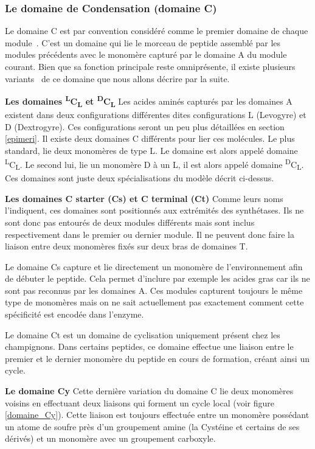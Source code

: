 \subsubsection{Le domaine de Condensation (domaine C)}

Le domaine C est par convention considéré comme le premier domaine de chaque module~\cite{stachelhaus_peptide_1998}.
C'est un domaine qui lie le morceau de peptide assemblé par les modules précédents avec le monomère capturé par le domaine A du module courant.
Bien que sa fonction principale reste omniprésente, il existe plusieurs variants~\cite{rausch_phylogenetic_2007} de ce domaine que nous allons décrire par la suite.

\textbf{Les domaines \textsuperscript{L}C\textsubscript{L} et \textsuperscript{D}C\textsubscript{L}}
Les acides aminés capturés par les domaines A existent dans deux configurations différentes dites configurations L (Levogyre) et D (Dextrogyre).
Ces configurations seront un peu plus détaillées en section \ref{epimeri}.
Il existe deux domaines C différents pour lier ces molécules.
Le plus standard, lie deux monomères de type L. Le domaine est alors appelé domaine \textsuperscript{L}C\textsubscript{L}.
Le second lui, lie un monomère D à un L, il est alors appelé domaine \textsuperscript{D}C\textsubscript{L}.
Ces domaines sont juste deux spécialisations du modèle décrit ci-dessus.

\textbf{Les domaines C starter (Cs) et C terminal (Ct)}
Comme leurs noms l'indiquent, ces domaines sont positionnés aux extrémités des synthétases.
Ils ne sont donc pas entourés de deux modules différents mais sont inclus respectivement dans le premier ou dernier module.
Il ne peuvent donc faire la liaison entre deux monomères fixés sur deux bras de domaines T.

Le domaine Cs capture et lie directement un monomère de l'environnement afin de débuter le peptide.
Cela permet d'inclure par exemple les acides gras car ils ne sont pas reconnus par les domaines A.
Ces modules capturent toujours le même type de monomères mais on ne sait actuellement pas exactement comment cette spécificité est encodée dans l'enzyme.

Le domaine Ct est un domaine de cyclisation uniquement présent chez les champignons.
Dans certains peptides, ce domaine effectue une liaison entre le premier et le dernier monomère du peptide en cours de formation, créant ainsi un cycle\cite{gao_cyclization_2012}.

\textbf{Le domaine Cy}
\label{Cy}
Cette dernière variation du domaine C lie deux monomères voisins en effectuant deux liaisons qui forment un cycle local (voir figure \ref{domaine_Cy}).
Cette liaison est toujours effectuée entre un monomère possédant un atome de soufre près d'un groupement amine (la Cystéine et certains de ses dérivés) et un monomère avec un groupement carboxyle.

